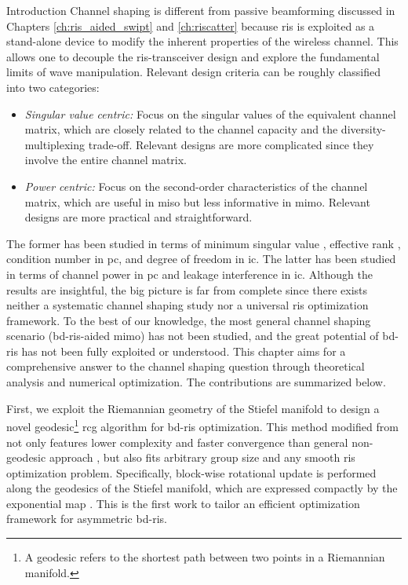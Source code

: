 \begin{section}{Introduction}
	Channel shaping is different from passive beamforming discussed in Chapters \ref{ch:ris_aided_swipt} and \ref{ch:riscatter} because \gls{ris} is exploited as a stand-alone device to modify the inherent properties of the wireless channel.
	This allows one to decouple the \gls{ris}-transceiver design and explore the fundamental limits of wave manipulation.
	Relevant design criteria can be roughly classified into two categories:
	\begin{itemize}
		\item \emph{Singular value centric:} Focus on the singular values of the equivalent channel matrix, which are closely related to the channel capacity and the diversity-multiplexing trade-off. Relevant designs are more complicated since they involve the entire channel matrix.
		\item \emph{Power centric:} Focus on the second-order characteristics of the channel matrix, which are useful in \gls{miso} but less informative in \gls{mimo}. Relevant designs are more practical and straightforward.
	\end{itemize}
	The former has been studied in terms of minimum singular value \cite{ElMossallamy2021}, effective rank \cite{ElMossallamy2021,Meng2023}, condition number \cite{Zheng2022,Huang2023} in \gls{pc}, and degree of freedom \cite{Bafghi2022,Zheng2023,Chae2023} in \gls{ic}.
	The latter has been studied in terms of channel power \cite{Wu2019,Nerini2023,Santamaria2023} in \gls{pc} and leakage interference \cite{Santamaria2023a} in \gls{ic}.
	Although the results are insightful, the big picture is far from complete since there exists neither a systematic channel shaping study nor a universal \gls{ris} optimization framework.
	To the best of our knowledge, the most general channel shaping scenario (\gls{bd}-\gls{ris}-aided \gls{mimo}) has not been studied, and the great potential of \gls{bd}-\gls{ris} has not been fully exploited or understood.
	This chapter aims for a comprehensive answer to the channel shaping question through theoretical analysis and numerical optimization.
	The contributions are summarized below.

	First, we exploit the Riemannian geometry of the Stiefel manifold to design a novel geodesic\footnote{A geodesic refers to the shortest path between two points in a Riemannian manifold.} \gls{rcg} algorithm for \gls{bd}-\gls{ris} optimization.
	This method modified from \cite{Abrudan2008,Abrudan2009} not only features lower complexity and faster convergence than general non-geodesic approach \cite{Absil2009,Pan2022d}, but also fits arbitrary group size and any smooth \gls{ris} optimization problem.
	Specifically, block-wise rotational update is performed along the geodesics of the Stiefel manifold, which are expressed compactly by the exponential map \cite{Edelman1998}.
	This is the first work to tailor an efficient optimization framework for asymmetric \gls{bd}-\gls{ris}.


\end{section}
